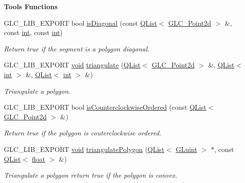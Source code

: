 \begin{Indent}{\bf Tools Functions}
\begin{DoxyCompactItemize}
G\-L\-C\-\_\-\-L\-I\-B\-\_\-\-E\-X\-P\-O\-R\-T bool \hyperlink{namespaceglc_a0e64a1e14165f7ff61f09bee2091f3d6}{is\-Diagonal} (const \hyperlink{class_q_list}{Q\-List}$<$ \hyperlink{glc__vector2d_8h_aa2ff653e68023d8ac19c421c53fd764a}{G\-L\-C\-\_\-\-Point2d} $>$ \&, const \hyperlink{ioapi_8h_a787fa3cf048117ba7123753c1e74fcd6}{int}, const \hyperlink{ioapi_8h_a787fa3cf048117ba7123753c1e74fcd6}{int})
\begin{DoxyCompactList}\small\item\em Return true if the segment is a polygon diagonal. \end{DoxyCompactList}\item 
G\-L\-C\-\_\-\-L\-I\-B\-\_\-\-E\-X\-P\-O\-R\-T \hyperlink{group___u_a_v_objects_plugin_ga444cf2ff3f0ecbe028adce838d373f5c}{void} \hyperlink{namespaceglc_a2093bae17f2d2e2646493709b445acc6}{triangulate} (\hyperlink{class_q_list}{Q\-List}$<$ \hyperlink{glc__vector2d_8h_aa2ff653e68023d8ac19c421c53fd764a}{G\-L\-C\-\_\-\-Point2d} $>$ \&, \hyperlink{class_q_list}{Q\-List}$<$ \hyperlink{ioapi_8h_a787fa3cf048117ba7123753c1e74fcd6}{int} $>$ \&, \hyperlink{class_q_list}{Q\-List}$<$ \hyperlink{ioapi_8h_a787fa3cf048117ba7123753c1e74fcd6}{int} $>$ \&)
\begin{DoxyCompactList}\small\item\em Triangulate a polygon. \end{DoxyCompactList}\item 
G\-L\-C\-\_\-\-L\-I\-B\-\_\-\-E\-X\-P\-O\-R\-T bool \hyperlink{namespaceglc_afe228dedc1463f6cf6ef6ee0221ce5ba}{is\-Counterclockwise\-Ordered} (const \hyperlink{class_q_list}{Q\-List}$<$ \hyperlink{glc__vector2d_8h_aa2ff653e68023d8ac19c421c53fd764a}{G\-L\-C\-\_\-\-Point2d} $>$ \&)
\begin{DoxyCompactList}\small\item\em Return true if the polygon is couterclockwise ordered. \end{DoxyCompactList}\item 
G\-L\-C\-\_\-\-L\-I\-B\-\_\-\-E\-X\-P\-O\-R\-T \hyperlink{group___u_a_v_objects_plugin_ga444cf2ff3f0ecbe028adce838d373f5c}{void} \hyperlink{namespaceglc_a34855c9d0c4a0de4dc26b02ac3f53646}{triangulate\-Polygon} (\hyperlink{class_q_list}{Q\-List}$<$ \hyperlink{glext_8h_a2f0c8cd5c21f9fcbd931c3f48bc90dfc}{G\-Luint} $>$ $\ast$, const \hyperlink{class_q_list}{Q\-List}$<$ \hyperlink{_super_l_u_support_8h_a6a1bb6ed41f44b60e7bd83b0e9945aa7}{float} $>$ \&)
\begin{DoxyCompactList}\small\item\em Triangulate a polygon return true if the polygon is convex. \end{DoxyCompactList}\item 

\end{DoxyCompactItemize}
\end{Indent}
